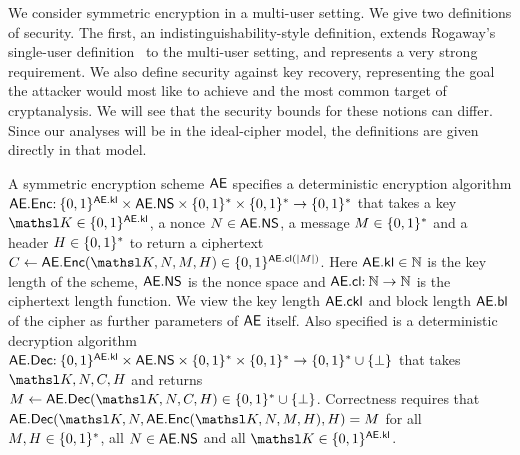 We consider symmetric encryption in a multi-user setting. We give two definitions of security. The first, an indistinguishability-style definition, extends Rogaway's single-user definition~\cite{CCS:Rogaway02} to the multi-user setting, and represents a very strong requirement. We also define security against key recovery, representing the goal the attacker would most like to achieve and the most common target of cryptanalysis. We will see that the security bounds for these notions can differ. Since our analyses will be in the ideal-cipher model, the definitions are given directly in that model.


 A symmetric encryption scheme $\mathsf{AE}$ specifies a 
deterministic encryption algorithm $\mathsf{AE}.\mathsf{Enc}  \allowbreak  {:\:}  \allowbreak  \{0,1\}^{\mathsf{AE}.\mathsf{kl}}  \allowbreak \times \allowbreak   \mathsf{AE}.\mathsf{NS}  \allowbreak  \times  \allowbreak  \{0,1\}^*  \allowbreak \times \{0,1\}^* \to \{0,1\}^*$ that takes a key $\nkey \in \bits^{\sekl}$, a nonce $N \in \mathsf{AE}.\mathsf{NS}$, a message $M\in\{0,1\}^*$ and a header $H\in\{0,1\}^*$ to return a ciphertext 
$
  \ciph \gets \allowbreak \seEnc(\nkey,\allowbreak \iv,\allowbreak \msg,\header) \allowbreak \in \allowbreak \bits^{\SEcl(|\msg|)}
$.
Here $\mathsf{AE}.\mathsf{kl}\in{{\mathbb N}}$ is the key length of the scheme, $\mathsf{AE}.\mathsf{NS}$ is the nonce space and $\mathsf{AE}.\mathsf{cl}{:\:}{{\mathbb N}}\to{{\mathbb N}}$ is the ciphertext length function.  We view the key length $\mathsf{AE}.\mathsf{ckl}$ and block length $\mathsf{AE}.\mathsf{bl}$ of the cipher as further parameters of $\mathsf{AE}$ itself. Also specified is a deterministic decryption algorithm $\mathsf{AE}.\mathsf{Dec} {:\:} \{0,1\}^{\mathsf{AE}.\mathsf{kl}}\times \mathsf{AE}.\mathsf{NS} \times \{0,1\}^* \times \{0,1\}^* \to \{0,1\}^*\cup\{\bot\}$  that takes $\nkey,\iv,\ciph,\header$ and returns $\msg \gets \seDec(\nkey,\iv,\ciph,\header) \in \bits^*\cup\{\bot\}$. Correctness requires that $\seDec(\nkey,\iv,\seEnc(\nkey,\iv,\msg,\header),\header) = \msg$ for all $M,H \in \{0,1\}^*$, all $N\in\mathsf{AE}.\mathsf{NS}$ and all $\nkey \in\bits^{\sekl}$.

